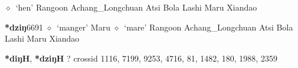 \begin{list}{}{\leftmargin=1.5em \itemindent=-1.5em}
         $\diamond$~`hen'
         Rangoon 
\hspace{1ex}
         Achang\_Longchuan 
\hspace{1ex}
         Atsi 
\hspace{1ex}
         Bola 
\hspace{1ex}
         Lashi 
\hspace{1ex}
         Maru 
\hspace{1ex}
         Xiandao 
  \item {\footnotesize \textbf{*dziŋ}}{\tiny 6691}
\hspace{1ex}
         $\diamond$~`manger'
         Maru 
\hspace{1ex}
         $\diamond$~`mare'
         Rangoon 
\hspace{1ex}
         Achang\_Longchuan 
\hspace{1ex}
         Atsi 
\hspace{1ex}
         Bola 
\hspace{1ex}
         Lashi 
\hspace{1ex}
         Maru 
\hspace{1ex}
         Xiandao 
  \end{list}
\item
\textbf{*diŋH}, \textbf{*dziŋH}
?
  {\tiny crossid 1116, 7199, 9253, 4716, 81, 1482, 180, 1988, 2359}
